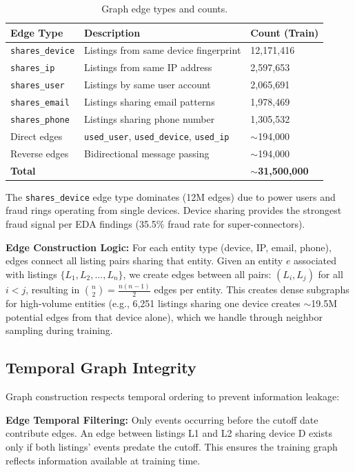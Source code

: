 \begin{table}[h]
\centering
\caption{Graph edge types and counts.}
\begin{tabular}{lll}
\hline
Edge Type & Description & Count (Train) \\
\hline
\texttt{shares\_device} & Listings from same device fingerprint & 12,171,416 \\
\texttt{shares\_ip} & Listings from same IP address & 2,597,653 \\
\texttt{shares\_user} & Listings by same user account & 2,065,691 \\
\texttt{shares\_email} & Listings sharing email patterns & 1,978,469 \\
\texttt{shares\_phone} & Listings sharing phone number & 1,305,532 \\
Direct edges & \texttt{used\_user}, \texttt{used\_device}, \texttt{used\_ip} & $\sim$194,000 \\
Reverse edges & Bidirectional message passing & $\sim$194,000 \\
\textbf{Total} & & \textbf{$\sim$31,500,000} \\
\hline
\end{tabular}
\end{table}

The \texttt{shares\_device} edge type dominates (12M edges) due to power users and fraud rings operating from single devices. Device sharing provides the strongest fraud signal per EDA findings (35.5\% fraud rate for super-connectors).

\textbf{Edge Construction Logic:} For each entity type (device, IP, email, phone), edges connect all listing pairs sharing that entity. Given an entity $e$ associated with listings $\{L_1, L_2, \ldots, L_n\}$, we create edges between all pairs: $(L_i, L_j)$ for all $i < j$, resulting in $\binom{n}{2} = \frac{n(n-1)}{2}$ edges per entity. This creates dense subgraphs for high-volume entities (e.g., 6,251 listings sharing one device creates $\sim$19.5M potential edges from that device alone), which we handle through neighbor sampling during training.

\subsection{Temporal Graph Integrity}

Graph construction respects temporal ordering to prevent information leakage:

\textbf{Edge Temporal Filtering:} Only events occurring before the cutoff date contribute edges. An edge between listings L1 and L2 sharing device D exists only if both listings' events predate the cutoff. This ensures the training graph reflects information available at training time.

